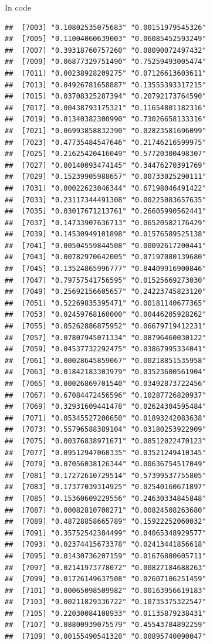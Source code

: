 \documentclass[ignorenonframetext,]{beamer}
\begin{document}
\begin{frame}[fragile]{In code}
\begin{verbatim}
##  [7003] "0.10802535075683" "0.00151979545326"
##  [7005] "0.11004060639003" "0.06085452593249"
##  [7007] "0.39318760757260" "0.08090072497432"
##  [7009] "0.06877329751490" "0.75259493005474"
##  [7011] "0.00238928209275" "0.07126613603611"
##  [7013] "0.04926781658887" "0.13555393317215"
##  [7015] "0.03708325287394" "0.20792173764590"
##  [7017] "0.00438793175321" "0.11654801182316"
##  [7019] "0.01340382300990" "0.73026658133316"
##  [7021] "0.06993858832390" "0.02823581696099"
##  [7023] "0.47735484547646" "0.21746216599975"
##  [7025] "0.21625420416049" "0.57720300498307"
##  [7027] "0.00140093474145" "0.34476270391769"
##  [7029] "0.15239905988657" "0.00733025290111"
##  [7031] "0.00022623046344" "0.67198046491422"
##  [7033] "0.23117344491308" "0.00225083657635"
##  [7035] "0.03017671213761" "0.26605990562441"
##  [7037] "0.14733907636713" "0.06520582176429"
##  [7039] "0.14530949101898" "0.01576589525138"
##  [7041] "0.00504559844508" "0.00092617200441"
##  [7043] "0.00782970642005" "0.07197080139680"
##  [7045] "0.13524865996777" "0.84409916900846"
##  [7047] "0.79757541756595" "0.01525669273030"
##  [7049] "0.25692156605657" "0.24223745823120"
##  [7051] "0.52269835395471" "0.00181140677365"
##  [7053] "0.02459768160000" "0.00446205928262"
##  [7055] "0.05262886875952" "0.06679719412231"
##  [7057] "0.07807945071334" "0.08796460030122"
##  [7059] "0.04537732292475" "0.03867995334041"
##  [7061] "0.00028645859067" "0.00218851535958"
##  [7063] "0.01842183303979" "0.03523600561904"
##  [7065] "0.00026869701540" "0.03492873722456"
##  [7067] "0.67084472456596" "0.10287726820937"
##  [7069] "0.32931609441478" "0.02624304595484"
##  [7071] "0.05345527200650" "0.01893242083638"
##  [7073] "0.55796588389104" "0.03180253922909"
##  [7075] "0.00376838971671" "0.08512022470123"
##  [7077] "0.09512947060335" "0.03521249410345"
##  [7079] "0.07056038126344" "0.00636754517049"
##  [7081] "0.17272610729514" "0.57399537755805"
##  [7083] "0.17377039314925" "0.02540160671897"
##  [7085] "0.15360609229556" "0.24630334845848"
##  [7087] "0.00082810700271" "0.00824508263680"
##  [7089] "0.48728858665789" "0.15922252060032"
##  [7091] "0.35752542384499" "0.04065348929577"
##  [7093] "0.02374415673378" "0.02413441856618"
##  [7095] "0.01430736207159" "0.01676880605711"
##  [7097] "0.02141973778072" "0.00827184688263"
##  [7099] "0.01726149637508" "0.02607106251459"
##  [7101] "0.00065098509982" "0.00163956619183"
##  [7103] "0.00211829336722" "0.10735375322547"
##  [7105] "0.22030084108933" "0.01135879238431"
##  [7107] "0.08800939075579" "0.45543784892259"
##  [7109] "0.00155490541320" "0.00895740090047"

\end{verbatim}
\end{frame}
\end{document}
